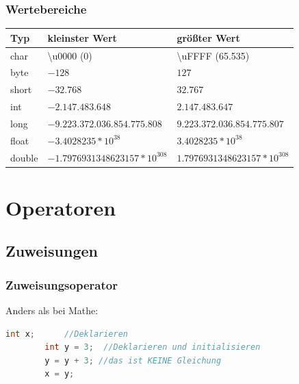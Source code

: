 \documentclass[18pt]{beamer}
\begin{document}
\begin{frame}[fragile]
	\frametitle{Wertebereiche}
	\begin{tabular}[ht]{|l|l|l|}
		\hline
		\textbf{Typ}	&	\textbf{kleinster Wert}			&	\textbf{größter Wert} 			\\
		\hline
		char 			&	\textbackslash u0000 (0)		&	\textbackslash uFFFF (65.535)	\\
		byte 			&	$-128$							&	$127$								\\
		short 			&	$-32.768$						&	$32.767$							\\
		int				&	$-2.147.483.648$				&	$2.147.483.647$					\\
		long 			&	$-9.223.372.036.854.775.808$	&	$9.223.372.036.854.775.807$		\\
		float			&	$-3.4028235*10^{38}$				&	$3.4028235*10^{38}$					\\
		double 			&	$-1.7976931348623157*10^{308}$		&	$1.7976931348623157*10^{308}$		\\
		\hline
	\end{tabular}

\end{frame}


\section{Operatoren}
\subsection{Zuweisungen}
\begin{frame}[fragile]
	\frametitle{Zuweisungsoperator}
	
	Anders als bei Mathe:
	
	\begin{lstlisting}[language=java]
		int x;		//Deklarieren
		int y = 3; 	//Deklarieren und initialisieren
		y = y + 3; //das ist KEINE Gleichung
		x = y;
	\end{lstlisting}
\end{frame}

\end{document}
